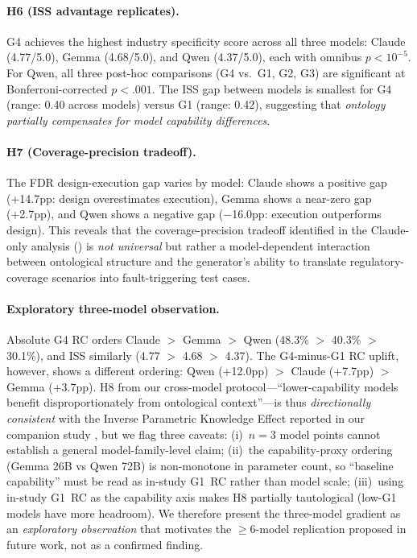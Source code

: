 \documentclass[11pt,a4paper]{article}
\begin{document}
\paragraph{H6 (ISS advantage replicates).}
G4 achieves the highest industry specificity score across all three
models: Claude (4.77/5.0), Gemma (4.68/5.0), and Qwen (4.37/5.0),
each with omnibus $p < 10^{-5}$. For Qwen, all three post-hoc
comparisons (G4 vs.\ G1, G2, G3) are significant at Bonferroni-corrected
$p < .001$. The ISS gap between models is smallest for G4 (range:
0.40 across models) versus G1 (range: 0.42), suggesting that
\emph{ontology partially compensates for model capability differences}.

\paragraph{H7 (Coverage-precision tradeoff).}
The FDR design-execution gap varies by model: Claude shows a positive
gap (+14.7pp: design overestimates execution), Gemma shows a near-zero
gap (+2.7pp), and Qwen shows a negative gap ($-$16.0pp: execution
outperforms design). This reveals that the coverage-precision tradeoff
identified in the Claude-only analysis () is
\emph{not universal} but rather a model-dependent interaction between
ontological structure and the generator's ability to translate
regulatory-coverage scenarios into fault-triggering test cases.

\paragraph{Exploratory three-model observation.}
Absolute G4 RC orders Claude $>$ Gemma $>$ Qwen (48.3\% $>$ 40.3\% $>$ 30.1\%), and ISS similarly (4.77 $>$ 4.68 $>$ 4.37). The G4-minus-G1 RC uplift, however, shows a different ordering: Qwen (+12.0pp) $>$ Claude (+7.7pp) $>$ Gemma (+3.7pp). H8 from our cross-model protocol---``lower-capability models benefit disproportionately from ontological context''---is thus \emph{directionally consistent} with the Inverse Parametric Knowledge Effect reported in our companion study \citep{luong2026neurosymbolic}, but we flag three caveats: (i)~$n{=}3$ model points cannot establish a general model-family-level claim; (ii)~the capability-proxy ordering (Gemma 26B vs Qwen 72B) is non-monotone in parameter count, so ``baseline capability'' must be read as in-study G1~RC rather than model scale; (iii)~using in-study G1~RC as the capability axis makes H8 partially tautological (low-G1 models have more headroom). We therefore present the three-model gradient as an \emph{exploratory observation} that motivates the $\geq$6-model replication proposed in future work, not as a confirmed finding.
\end{document}
